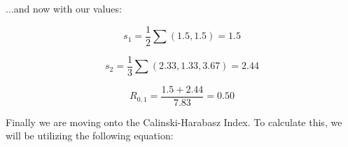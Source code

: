 \documentclass{article}
\begin{document}
\noindent ...and now with our values:

\begin{equation}
    s_1 = \frac{1}{2} \sum (1.5, 1.5) = 1.5
\end{equation}

\begin{equation}
    s_2 = \frac{1}{3} \sum (2.33, 1.33, 3.67) = 2.44
\end{equation}

\begin{equation}
    R_{0,1} = \frac{1.5 + 2.44}{7.83} = 0.50
\end{equation}

Finally we are moving onto the Calinski-Harabasz Index. To calculate this, we will be utilizing the following equation:
\end{document}
